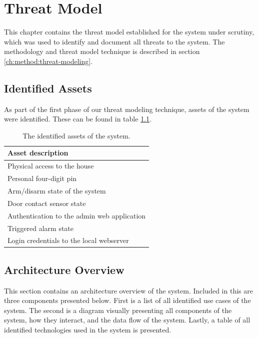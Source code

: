 \chapter{Threat Model} \label{ch:threat-model}
This chapter contains the threat model established for the system under scrutiny, which was used to identify and document all threats to the system. The methodology and threat model technique is described in section \ref{ch:method:threat-modeling}.

\section{Identified Assets}
As part of the first phase of our threat modeling technique, assets of the system were identified. These can be found in table \ref{tb:assets}.
\begin{table}[!ht]
    \centering
    \begin{tabular}{l}
        \hline
        \textbf{Asset description}
        \\ \hline
        Physical access to the house
        \\
        Personal four-digit pin
        \\
        Arm/disarm state of the system
        \\
        Door contact sensor state
        \\
        Authentication to the admin web application
        \\
        Triggered alarm state
        \\
        Login credentials to the local webserver
        \\ \hline
    \end{tabular}
    \caption{The identified assets of the system.}
    \label{tb:assets}
\end{table}

\section{Architecture Overview}
This section contains an architecture overview of the system. Included in this are three components presented below. First is a list of all identified use cases of the system. The second is a diagram visually presenting all components of the system, how they interact, and the data flow of the system. Lastly, a table of all identified technologies used in the system is presented.

